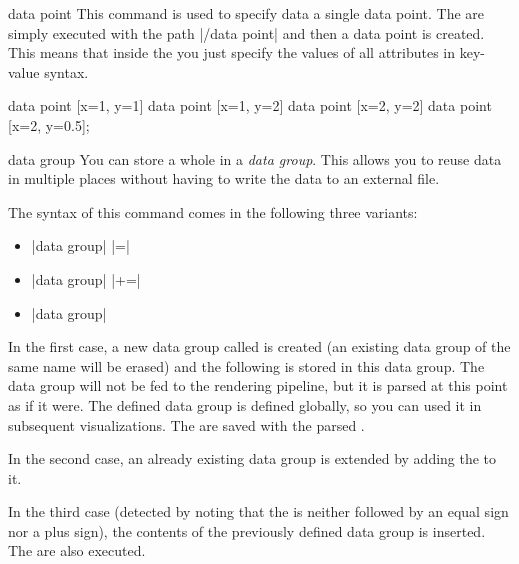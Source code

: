 \begin{datavisualizationoperation}{data point}{}
  This command is used to specify data a single data point. The
   are simply executed with the path |/data point| and
  then a data point is created. This means that inside the
   you just specify the values of all attributes in
  key-value syntax.
\begin{codeexample}[]
\tikz {}
  data point [x=1, y=1]    data point [x=1, y=2]
  data point [x=2, y=2]    data point [x=2, y=0.5];
\end{codeexample}
\end{datavisualizationoperation}


\begin{datavisualizationoperation}{data group}{}
  You can store a whole  in a \emph{data
    group}. This allows you to reuse data in multiple places without
  having to write the data to an external file.

  The syntax of this command comes in the following three variants:
  \begin{itemize}
  \item |data group|   |=| 
  \item |data group|   |+=| 
  \item |data group|  
  \end{itemize}
  In the first case, a new data group called  is created (an
  existing data group of the same name will be erased) and the following
   is stored in this data group. The data group
  will not be fed to the rendering pipeline, but it is parsed at this
  point as if it were. The defined data group is defined globally, so
  you can used it in subsequent visualizations. The  are
  saved with the parsed .

  In the second case, an already existing data group is extended by
  adding the  to it.

  In the third case (detected by noting that the  is
  neither followed by an equal sign nor a plus sign), the contents of
  the previously defined data group  is inserted. The
   are also executed.


\end{datavisualizationoperation}
